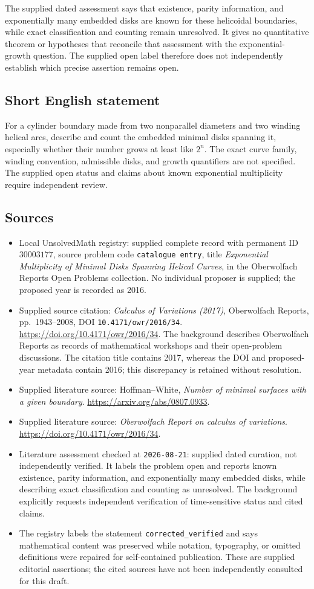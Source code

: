 \documentclass[11pt]{article}
\begin{document}
The supplied dated assessment says that existence, parity information, and exponentially many embedded disks are known for these helicoidal boundaries, while exact classification and counting remain unresolved. It gives no quantitative theorem or hypotheses that reconcile that assessment with the exponential-growth question. The supplied open label therefore does not independently establish which precise assertion remains open.
\subsection{Short English statement}
For a cylinder boundary made from two nonparallel diameters and two winding helical arcs, describe and count the embedded minimal disks spanning it, especially whether their number grows at least like \(2^n\). The exact curve family, winding convention, admissible disks, and growth quantifiers are not specified. The supplied open status and claims about known exponential multiplicity require independent review.
\subsection{Sources}
\begin{itemize}
\item Local UnsolvedMath registry: supplied complete record with permanent ID \(30003177\), source problem code \texttt{catalogue entry}, title \emph{Exponential Multiplicity of Minimal Disks Spanning Helical Curves}, in the Oberwolfach Reports Open Problems collection. No individual proposer is supplied; the proposed year is recorded as 2016.
\item Supplied source citation: \emph{Calculus of Variations (2017)}, Oberwolfach Reports, pp.\ 1943--2008, DOI \texttt{10.4171/owr/2016/34}. \url{https://doi.org/10.4171/owr/2016/34}. The background describes Oberwolfach Reports as records of mathematical workshops and their open-problem discussions. The citation title contains 2017, whereas the DOI and proposed-year metadata contain 2016; this discrepancy is retained without resolution.
\item Supplied literature source: Hoffman--White, \emph{Number of minimal surfaces with a given boundary}. \url{https://arxiv.org/abs/0807.0933}.
\item Supplied literature source: \emph{Oberwolfach Report on calculus of variations}. \url{https://doi.org/10.4171/owr/2016/34}.
\item Literature assessment checked at \texttt{2026-08-21}: supplied dated curation, not independently verified. It labels the problem open and reports known existence, parity information, and exponentially many embedded disks, while describing exact classification and counting as unresolved. The background explicitly requests independent verification of time-sensitive status and cited claims.
\item The registry labels the statement \texttt{corrected\_verified} and says mathematical content was preserved while notation, typography, or omitted definitions were repaired for self-contained publication. These are supplied editorial assertions; the cited sources have not been independently consulted for this draft.
\end{itemize}
\end{document}
